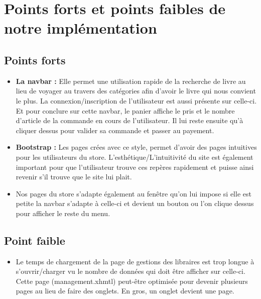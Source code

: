 \section{Points forts et points faibles de notre implémentation}

	\subsection{Points forts}
	\begin{itemize}
		\item \textbf{La navbar :} Elle permet une utilisation rapide de la recherche de livre au lieu de voyager au travers des catégories afin d'avoir le livre qui nous convient le plus. La connexion/inscription de l'utilisateur est aussi présente sur celle-ci. Et pour conclure sur cette navbar, le panier affiche le pris et le nombre d'article de la commande en cours de l'utilisateur. Il lui reste ensuite qu'à cliquer dessus pour valider sa commande et passer au payement.

		\item \textbf{Bootstrap :} Les pages crées avec ce style, permet d'avoir des pages intuitives pour les utilisateurs du store. L'esthétique/L'intuitivité du site est également important pour que l'utilisateur trouve ces repères rapidement et puisse ainsi revenir s'il trouve que le site lui plait.

		\item Nos pages du store s'adapte également au fenêtre qu'on lui impose si elle est petite la navbar s'adapte à celle-ci et devient un bouton ou l'on clique dessus pour afficher le reste du menu.
	\end{itemize}


	\subsection{Point faible}
	\begin{itemize}
		\item Le temps de chargement de la page de gestions des libraires est trop longue à s'ouvrir/charger vu le nombre de données qui doit être afficher sur celle-ci. Cette page (management.xhmtl) peut-être optimisée pour devenir plusieurs pages au lieu de faire des onglets. En gros, un onglet devient une page.
	\end{itemize}
